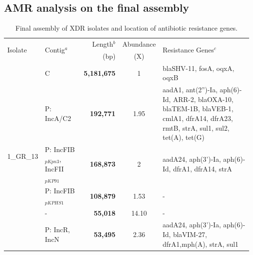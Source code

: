 \subsection{AMR analysis on the final assembly}

\begin{landscape}
\begin{table}[!ht]
\centering
\scriptsize
\caption{Final assembly of XDR \kp{} isolates and location of antibiotic resistance genes.}
\label{tab:assers_final}
\begin{tabular}{|l|l|r|c|p{12cm}|}
\hline
\multirow{2}{*}{\small Isolate}  & \multirow{2}{*}{\small Contig$^a$}   & {\small Length$^b$} & {\small Abundance} & \multirow{2}{*}{\small Resistance Genes$^c$}\\
 & & (bp) & (X) & \\ \hline \hline
\multirow{6}{*}{1\_GR\_13}  & C                           & \textbf{5,181,675}     & 1        & blaSHV-11, fosA, oqxA, oqxB                                                                                                                \\ \cline{2-5} 
                            & P: IncA/C2                  & \textbf{192,771}      & 1.95     & aadA1, ant(2'')-Ia, aph(6)-Id, ARR-2, blaOXA-10, blaTEM-1B, blaVEB-1, cmlA1, dfrA14, dfrA23, rmtB, strA, sul1, sul2, tet(A), tet(G)        \\ \cline{2-5} 
                            & P: IncFIB$_{pKpn3}$, IncFII$_{pKP91}$ & \textbf{168,873}      & 2        & aadA24, aph(3')-Ia, aph(6)-Id, dfrA1, dfrA14, strA                                                                                         \\ \cline{2-5} 
                            & P: IncFIB$_{pKPHS1}$             & \textbf{108,879}      & 1.53     & -                                                                                                                                          \\ \cline{2-5} 
                            & -                           & \textbf{55,018}       & 14.10    & -                                                                                                                                          \\ \cline{2-5} 
                            & P: IncR, IncN               & \textbf{53,495}       & 2.36     & aadA24, aph(3')-Ia, aph(6)-Id, blaVIM-27, dfrA1,mph(A), strA, sul1                                                                         \\ \hline \hline

\end{tabular}
\end{table}
\end{landscape}
